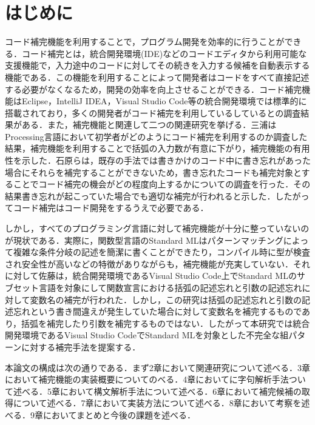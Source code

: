 \documentclass[12pt,a4j]{jreport}
\begin{document}
\chapter{はじめに}
コード補完機能を利用することで，プログラム開発を効率的に行うことができる．コード補完とは，統合開発環境(IDE)などのコードエディタから利用可能な支援機能で，入力途中のコードに対してその続きを入力する候補を自動表示する機能である．この機能を利用することによって開発者はコードをすべて直接記述する必要がなくなるため，開発の効率を向上させることができる．コード補完機能はEclipse，IntelliJ IDEA，Visual Studio Code等の統合開発環境では標準的に搭載されており，多くの開発者がコード補完を利用しているしているとの調査結果がある\cite{useIDE}．また，補完機能と関連して二つの関連研究を挙げる．三浦\cite{eff}はProcessing言語において初学者がどのようにコード補完を利用するのか調査した結果，補完機能を利用することで括弧の入力数が有意に下がり，補完機能の有用性を示した．石原らは，既存の手法では書きかけのコード中に書き忘れがあった場合にそれらを補完することができないため，書き忘れたコードも補完対象とすることでコード補完の機会がどの程度向上するかについての調査を行った．その結果書き忘れが起こっていた場合でも適切な補完が行われると示した．したがってコード補完はコード開発をするうえで必要である．

しかし，すべてのプログラミング言語に対して補完機能が十分に整っていないのが現状である．実際に，関数型言語のStandard ML\cite{StandardML}はパターンマッチングによって複雑な条件分岐の記述を簡潔に書くことができたり，コンパイル時に型が検査され安全性が高いなどの特徴がありながらも，補完機能が充実していない．それに対して佐藤は\cite{sato}，統合開発環境であるVisual Studio Code\cite{vscode}上でStandard MLのサブセット言語を対象にして関数宣言における括弧の記述忘れと引数の記述忘れに対して変数名の補完が行われた．しかし，この研究は括弧の記述忘れと引数の記述忘れという書き間違えが発生していた場合に対して変数名を補完するものであり，括弧を補完したり引数を補完するものではない．したがって本研究では統合開発環境であるVisual Studio CodeでStandard MLを対象とした不完全な組パターンに対する補完手法を提案する．

本論文の構成は次の通りである．まず2章において関連研究について述べる．3章において補完機能の実装概要についてのべる．4章においてに字句解析手法ついて述べる．5章において構文解析手法について述べる．6章において補完候補の取得について述べる．7章において実装方法について述べる．8章において考察を述べる．9章においてまとめと今後の課題を述べる．

\end{document}
